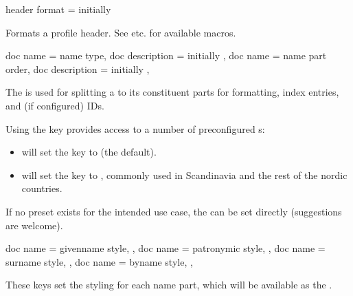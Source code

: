 \documentclass[
	a4paper,
]{article}
\begin{document}
\begin{docKey}
	{header format}
	{=}
	{initially }

	Formats a profile header. See  etc. for available macros.
\end{docKey}

\begin{docKeys}
	[
		doc parameter = {=\meta{...}},
	]
	{
		{
			doc name = name type,
			doc description = {initially }
		},
		{
			doc name = name part order,
			doc description = {initially }
		},
	}

	The  is used for splitting a  to its constituent parts for formatting, index entries, and (if configured) IDs.

	Using the  key provides access to a number of preconfigured s:

	\begin{itemize}
		\item {} will set the  key to  (the default).
		\item {} will set the  key to , commonly used in Scandinavia and the rest of the nordic countries.
	\end{itemize}

	If no preset  exists for the intended use case, the  can be set directly (suggestions are welcome).
\end{docKeys}

\begin{docKeys}
	[
		doc parameter = {=\meta{...}},
		doc description = {initially not set},
	]
	{
		{
			doc name = givenname style,
		},
		{
			doc name = patronymic style,
		},
		{
			doc name = surname style,
		},
		{
			doc name = byname style,
		},
	}

	These keys set the styling for each name part, which will be available as the .

\end{docKeys}
\end{document}
